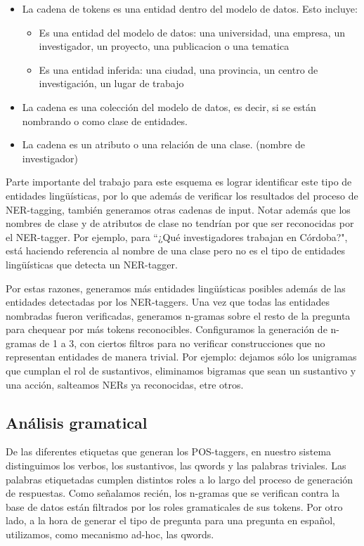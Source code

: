 \begin{itemize}
  \item La cadena de tokens es una entidad dentro del modelo de datos. Esto incluye:
    \begin{itemize}
      \item Es una entidad del modelo de datos: una universidad, una empresa, un investigador, un proyecto, una publicacion o una tematica
      \item Es una entidad inferida: una ciudad, una provincia, un centro de investigación, un lugar de trabajo
    \end{itemize}
  \item La cadena es una colección del modelo de datos, es decir, si se están nombrando  o  como clase de entidades.
  \item La cadena es un atributo o una relación de una clase. (nombre de investigador)
\end{itemize}

Parte importante del trabajo para este esquema es lograr identificar este tipo de entidades lingüísticas, por lo que además de verificar los resultados del proceso de NER-tagging, también generamos otras cadenas de input. Notar además que los nombres de clase y de atributos de clase no tendrían por que ser reconocidas por el NER-tagger. Por ejemplo, para ``¿Qué investigadores trabajan en Córdoba?",  está haciendo referencia al nombre de una clase pero no es el tipo de entidades lingüísticas que detecta un NER-tagger. 

Por estas razones, generamos más entidades lingüísticas posibles además de las entidades detectadas por los NER-taggers. Una vez que todas las entidades nombradas fueron verificadas, generamos n-gramas sobre el resto de la pregunta para chequear por más tokens reconocibles. Configuramos la generación de n-gramas de 1 a 3, con ciertos filtros para no verificar construcciones que no representan entidades de manera trivial. Por ejemplo: dejamos sólo los unigramas que cumplan el rol de sustantivos, eliminamos bigramas que sean un sustantivo y una acción, salteamos NERs ya reconocidas, etre otros.


\subsection{Análisis gramatical}
\label{subsec:impl-pos}
De las diferentes etiquetas que generan los POS-taggers, en nuestro sistema distinguimos los verbos, los sustantivos, las qwords y las palabras triviales. 
Las palabras etiquetadas cumplen distintos roles a lo largo del proceso de generación de respuestas. Como señalamos recién, los n-gramas que se verifican contra la base de datos están filtrados por los roles gramaticales de sus tokens. Por otro lado, a la hora de generar el tipo de pregunta para una pregunta en español, utilizamos, como mecanismo ad-hoc, las qwords. 


